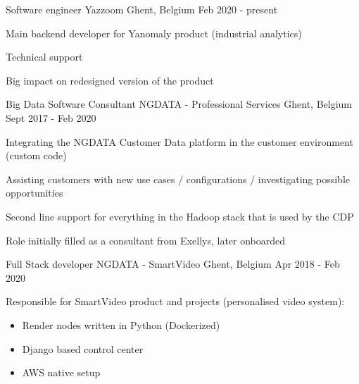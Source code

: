 


\begin{cventries}


\cventry
{Software engineer} %
{Yazzoom} %
{Ghent, Belgium} %
{Feb 2020 - present} %
{ %
\begin{cvitems}
\item {Main backend developer for Yanomaly product (industrial analytics)}
\item {Technical support}
\item {Big impact on redesigned version of the product}
\end{cvitems}
}



\cventry
{Big Data Software Consultant} %
{NGDATA - Professional Services} %
{Ghent, Belgium} %
{Sept 2017 - Feb 2020} %
{ %
\begin{cvitems}
\item {Integrating the NGDATA Customer Data platform in the customer environment (custom code)}
\item {Assisting customers with new use cases / configurations / investigating possible opportunities}
\item {Second line support for everything in the Hadoop stack that is used by the CDP}
\item {Role initially filled as a consultant from Exellys, later onboarded}
\end{cvitems}
}


\cventry
{Full Stack developer} %
{NGDATA - SmartVideo} %
{Ghent, Belgium} %
{Apr 2018 - Feb 2020} %
{ %
\begin{cvitems}
\item {Responsible for SmartVideo product and projects (personalised video system):}
\begin{itemize}
\item {Render nodes written in Python (Dockerized)}
\item {Django based control center}
\item {AWS native setup}
\end{itemize}
\end{cvitems}
}


\end{cventries}
